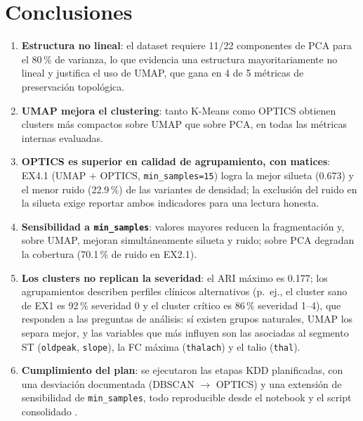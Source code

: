 \documentclass[11pt,a4paper]{article}
\begin{document}
\section{Conclusiones}\label{sec:conclusiones}

\begin{enumerate}
  \item \textbf{Estructura no lineal}: el dataset requiere 11/22 componentes de PCA para el
        80\,\% de varianza, lo que evidencia una estructura mayoritariamente no lineal y
        justifica el uso de UMAP, que gana en 4 de 5 métricas de preservación topológica.
  \item \textbf{UMAP mejora el clustering}: tanto K-Means como OPTICS obtienen clusters más
        compactos sobre UMAP que sobre PCA, en todas las métricas internas evaluadas.
  \item \textbf{OPTICS es superior en calidad de agrupamiento, con matices}: EX4.1 (UMAP +
        OPTICS, \texttt{min\_samples=15}) logra la mejor silueta (0.673) y el menor ruido
        (22.9\,\%) de las variantes de densidad; la exclusión del ruido en la silueta exige
        reportar ambos indicadores para una lectura honesta.
  \item \textbf{Sensibilidad a \texttt{min\_samples}}: valores mayores reducen la
        fragmentación y, sobre UMAP, mejoran simultáneamente silueta y ruido; sobre PCA
        degradan la cobertura (70.1\,\% de ruido en EX2.1).
  \item \textbf{Los clusters no replican la severidad}: el ARI máximo es 0.177; los
        agrupamientos describen perfiles clínicos alternativos (p.~ej., el cluster sano de
        EX1 es 92\,\% severidad 0 y el cluster crítico es 86\,\% severidad 1--4), que
        responden a las preguntas de análisis: sí existen grupos naturales, UMAP los separa
        mejor, y las variables que más influyen son las asociadas al segmento ST
        (\texttt{oldpeak}, \texttt{slope}), la FC máxima (\texttt{thalach}) y el talio
        (\texttt{thal}).
  \item \textbf{Cumplimiento del plan}: se ejecutaron las etapas KDD planificadas, con una
        desviación documentada (DBSCAN $\rightarrow$ OPTICS) y una extensión de
        sensibilidad de \texttt{min\_samples}, todo reproducible desde el notebook
        \cite{notebook} y el script consolidado \cite{script}.
\end{enumerate}
\end{document}
